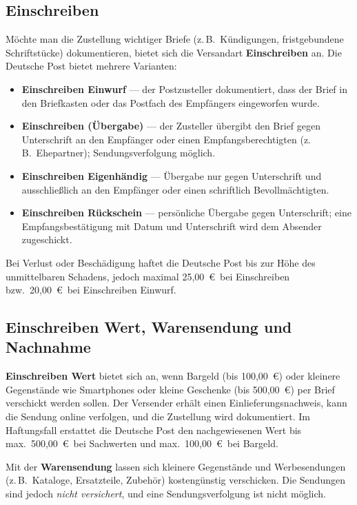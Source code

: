 \documentclass[11pt, a4paper]{article}
\begin{document}
\subsection{Einschreiben}

Möchte man die Zustellung wichtiger Briefe (z.\,B.\ Kündigungen, fristgebundene
Schriftstücke) dokumentieren, bietet sich die Versandart \textbf{Einschreiben} an. Die
Deutsche Post bietet mehrere Varianten:

\begin{itemize}
  \item \textbf{Einschreiben Einwurf} --- der Postzusteller dokumentiert, dass der Brief in den Briefkasten oder das Postfach des Empfängers eingeworfen wurde.
  \item \textbf{Einschreiben (Übergabe)} --- der Zusteller übergibt den Brief gegen Unterschrift an den Empfänger oder einen Empfangsberechtigten (z.\,B.\ Ehepartner); Sendungsverfolgung möglich.
  \item \textbf{Einschreiben Eigenhändig} --- Übergabe nur gegen Unterschrift und ausschließlich an den Empfänger oder einen schriftlich Bevollmächtigten.
  \item \textbf{Einschreiben Rückschein} --- persönliche Übergabe gegen Unterschrift; eine Empfangsbestätigung mit Datum und Unterschrift wird dem Absender zugeschickt.
\end{itemize}

Bei Verlust oder Beschädigung haftet die Deutsche Post bis zur Höhe des unmittelbaren
Schadens, jedoch maximal 25,00~€\ bei Einschreiben bzw.\ 20,00~€\ bei Einschreiben
Einwurf.

\subsection{Einschreiben Wert, Warensendung und Nachnahme}

\textbf{Einschreiben Wert} bietet sich an, wenn Bargeld (bis 100,00~€) oder kleinere
Gegenstände wie Smartphones oder kleine Geschenke (bis 500,00~€) per Brief verschickt
werden sollen. Der Versender erhält einen Einlieferungsnachweis, kann die Sendung online
verfolgen, und die Zustellung wird dokumentiert. Im Haftungsfall erstattet die Deutsche
Post den nachgewiesenen Wert bis max.\ 500,00~€\ bei Sachwerten und max.\ 100,00~€\
bei Bargeld.

Mit der \textbf{Warensendung} lassen sich kleinere Gegenstände und Werbesendungen
(z.\,B.\ Kataloge, Ersatzteile, Zubehör) kostengünstig verschicken. Die Sendungen sind
jedoch \emph{nicht versichert}, und eine Sendungsverfolgung ist nicht möglich.
\end{document}
